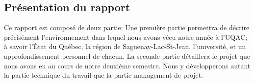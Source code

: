 \subsection{Présentation du rapport}

Ce rapport est composé de deux partie:\newline
Une première partie permettra de décrire précisément l’environnement dans lequel nous avons vécu notre année à l’UQAC; à savoir l’État du Québec, la région de Saguenay-Lac-St-Jean, l’université, et un approfondissement personnel de chacun.\newline
La seconde partie détaillera le projet que nous avons eu au cours de notre deuxième semestre. Nous y développerons autant la partie technique du travail que la partie management de projet.

